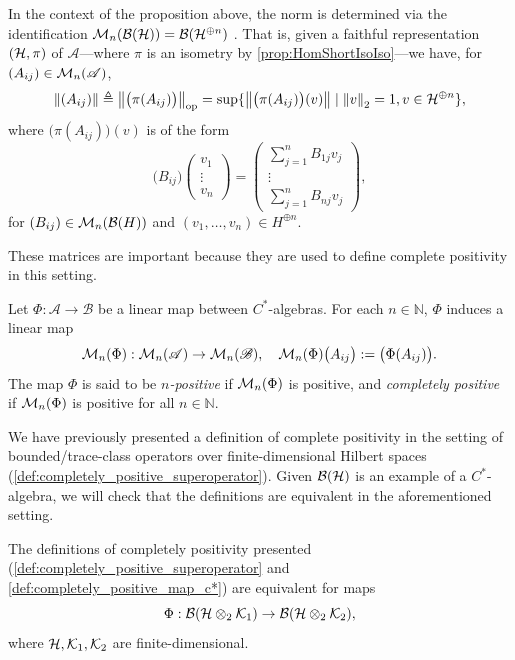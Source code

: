 In the context of the proposition above, the norm is determined via the identification $\mathcal{M}_n(\mathcal{B}(\mathcal{H})) =\mathcal{B}(\mathcal{H}^{\oplus n})$
\cite[Exercises~1.1 and~1.2]{paulsenCompletelyBoundedMaps2003}. That is, given a faithful representation \((\mathcal{H}, \pi)\) of \(\mathscr{A}\)---where \(\pi\) is an isometry by \autoref{prop:HomShortIsoIso}---we have, for \((A_{ij}) \in \mathcal{M}_{n}(\mathscr{A})\),
\[
\left\lVert (A_{ij}) \right\rVert \triangleq \left\lVert \big(\pi (A_{ij}) \big) \right\rVert_{\text{op}} = \sup\{ \left\lVert  \big(\pi (A_{ij}) \big) (v) \right\rVert \mid \left\lVert v \right\rVert_{2} = 1, v \in \mathcal{H}^{\oplus n} \},
\]
where $\big(\pi (A_{ij})\big) (v) $ is of the form 
\[
\bigl(B_{ij}\bigr)
\begin{pmatrix}
v_{1} \\
\vdots \\
v_{n}
\end{pmatrix}
=
\begin{pmatrix}
\displaystyle\sum_{j=1}^n B_{1j} v_{j} \\
\vdots \\
\displaystyle\sum_{j=1}^n B_{nj} v_{j}
\end{pmatrix},
\]
for $(B_{ij}) \in \mathcal{M}_{n}(\mathcal{B}(H))$ and $(v_1, \ldots, v_n) \in H^{\oplus n}$.


These matrices are important because they are used to define complete positivity in this setting.

\begin{definition} \label{def:completely_positive_map_c*}
  Let \( \Phi : \mathscr{A} \to \mathscr{B} \) be a linear map between \( C^* \)-algebras. For each \( n \in \mathbb{N} \), \( \Phi \) induces a linear map
\[
\mathcal{M}_{n}(\Phi) :\mathcal{M}_{n}(\mathscr{A}) \to \mathcal{M}_{n}(\mathscr{B}), \quad \mathcal{M}_{n}(\Phi)\big( A_{ij} \big) := \big( \Phi(A_{ij}) \big).
\]
The map \( \Phi \) is said to be \emph{\( n \)-positive} if \(\mathcal{M}_{n}(\Phi) \) is positive, and \emph{completely positive} if \( \mathcal{M}_{n}(\Phi) \) is positive for all \( n \in \mathbb{N} \).
\end{definition}

We have previously presented a definition of complete positivity in the setting of bounded/trace-class operators over finite-dimensional Hilbert spaces (\autoref{def:completely_positive_superoperator}). Given $\mathcal{B}(\mathcal{H})$ is an example of a $C^*$-algebra, we will check that the definitions are equivalent in the aforementioned setting.


\begin{proposition} \label{pro:cp_compatible}
  The definitions of completely positivity presented (\autoref{def:completely_positive_superoperator} and \autoref{def:completely_positive_map_c*}) are equivalent for maps 
  $$\Phi: \mathcal{B}(\mathcal{H} \otimes_2 \mathcal{K}_1 ) \to \mathcal{B}(\mathcal{H} \otimes_2 \mathcal{K}_2), $$
where $\mathcal{H}, \mathcal{K}_1,\mathcal{K}_2$ are finite-dimensional.
\end{proposition}

